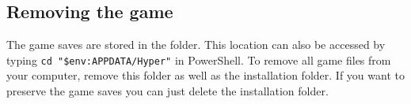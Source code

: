 \subsection{Removing the game}
The game saves are stored in the  folder.
This location can also be accessed by typing \texttt{cd "\$env:APPDATA/Hyper"} in PowerShell.
To remove all game files from your computer, remove this folder as well as the installation folder.
If you want to preserve the game saves you can just delete the installation folder.